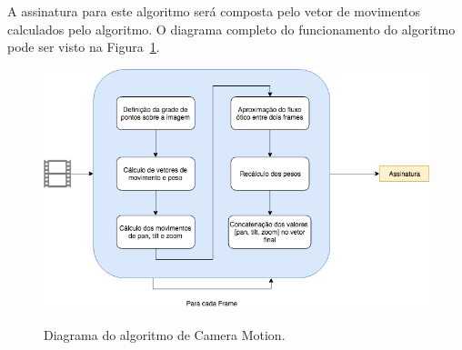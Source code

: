 


A assinatura para este algoritmo será composta pelo vetor de movimentos calculados pelo algoritmo. O diagrama completo do funcionamento do algoritmo pode ser visto na Figura~\ref{fig:dia_cameramotion}.

\begin{figure}[h]
	\centering
	\caption{Diagrama do algoritmo de Camera Motion.}
	\includegraphics[width=\textwidth]{dados/figuras/diagramas/Diag-CameraMotion}
	\label{fig:dia_cameramotion}
\end{figure}







